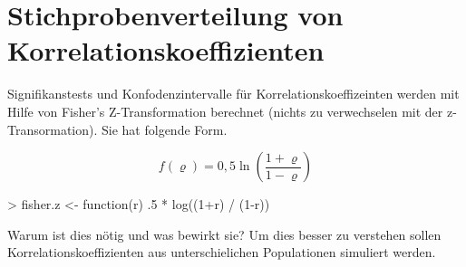 
\renewenvironment{Schunk}{\vspace{10pt}}{\vspace{8pt}}   

\section{Stichprobenverteilung von Korrelationskoeffizienten}

Signifikanstests und Konfodenzintervalle für Korrelationskoeffizeinten werden mit Hilfe von Fisher's Z-Transformation berechnet (nichts zu verwechselen mit der z-Transormation). Sie hat folgende Form.

\begin{equation} \label{eq:fisher}
  f(\varrho)=0{,}5\ln\left(\frac{1+\varrho}{1-\varrho}\right)  
\end{equation}                                               

\begin{Schunk}
\begin{Sinput}
> fisher.z <- function(r){
   .5 * log((1+r) / (1-r))
 }
\end{Sinput}
\end{Schunk}


Warum ist dies nötig und was bewirkt sie? Um dies besser zu verstehen sollen Korrelationskoeffizienten aus unterschielichen Populationen simuliert werden.

